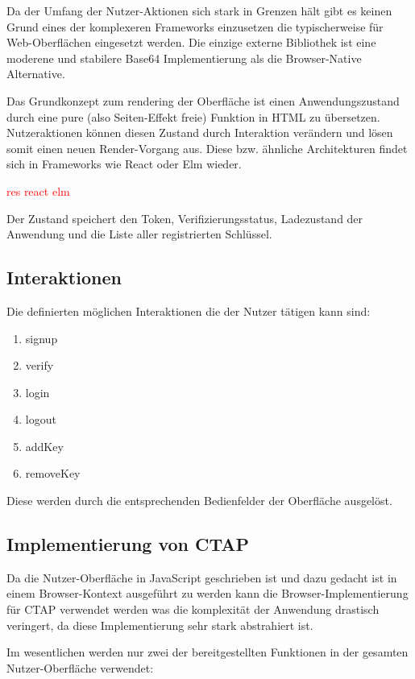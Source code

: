 \documentclass[journal]{IEEEtran}
\begin{document}
Da der Umfang der Nutzer-Aktionen sich stark in Grenzen hält gibt es keinen
Grund eines der komplexeren Frameworks einzusetzen die typischerweise für
Web-Oberflächen eingesetzt werden. Die einzige externe Bibliothek ist eine
moderene und stabilere Base64 Implementierung als die Browser-Native
Alternative.

Das Grundkonzept zum rendering der Oberfläche ist einen Anwendungszustand durch
eine pure (also Seiten-Effekt freie) Funktion in HTML zu übersetzen.
Nutzeraktionen können diesen Zustand durch Interaktion verändern und lösen
somit einen neuen Render-Vorgang aus. Diese bzw. ähnliche Architekturen findet
sich in Frameworks wie React oder Elm wieder.

\textcolor{red}{res react elm}

Der Zustand speichert den Token, Verifizierungsstatus, Ladezustand der
Anwendung und die Liste aller registrierten Schlüssel.

\subsection{Interaktionen}

Die definierten möglichen Interaktionen die der Nutzer tätigen kann sind:

\begin{enumerate}
	\item signup
	\item verify
	\item login
	\item logout
	\item addKey
	\item removeKey
\end{enumerate}

Diese werden durch die entsprechenden Bedienfelder der Oberfläche ausgelöst.

\subsection{Implementierung von CTAP}

Da die Nutzer-Oberfläche in JavaScript geschrieben ist und dazu gedacht ist in
einem Browser-Kontext ausgeführt zu werden kann die Browser-Implementierung für
CTAP verwendet werden was die komplexität der Anwendung drastisch veringert, da
diese Implementierung sehr stark abstrahiert ist.

Im wesentlichen werden nur zwei der bereitgestellten Funktionen in der gesamten
Nutzer-Oberfläche verwendet:
\end{document}

